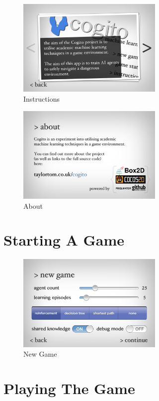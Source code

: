 \documentclass[a4paper,oneside]{report}
\begin{document}
\begin{figure}[h!]
  \centering
    \includegraphics[width=70mm]{sources/images/Instructions}
    \caption{Instructions}
\end{figure}

\begin{figure}[h!]
  \centering
    \includegraphics[width=70mm]{sources/images/About}
    \caption{About}
\end{figure}

\section{Starting A Game}

\begin{figure}[h!]
  \centering
    \includegraphics[width=70mm]{sources/images/NewGame}
    \caption{New Game}
\end{figure}

\section{Playing The Game}
\end{document}
